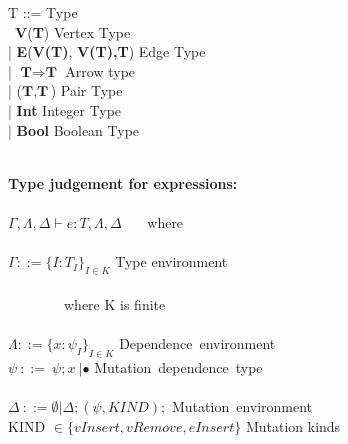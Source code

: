 \begin{frame}
  \begin{tiny}
  \begin{roman-grammar}
  
  
  T ::= \>\>\>\>\> Type \\
    \ttab \ \textbf{V}(\textbf{T}) \>\>\>\>\> Vertex Type \\
    \ttab | \textbf{E}(\textbf{V(T)}, \textbf{V(T),}\textbf{T}) \>\>\>\>\> Edge Type\\
    \ttab | $\textbf{T} \Rightarrow \textbf{T}$ \>\>\>\>\> Arrow type \\
    \ttab | ($\textbf{T}, \textbf{T}$) \>\>\>\>\> Pair Type \\
    \ttab | \textbf{Int} \>\>\>\>\> Integer Type \\
    \ttab | \textbf{Bool} \>\>\>\>\> Boolean Type\\ 
\ \\
\newline
\newline

  \textbf{Type judgement for expressions:}
  \\ \ \\
  $\Gamma, \Lambda, \Delta \vdash e : T, \Lambda, \Delta$ \ \ \  where \\ \ \\
  $\Gamma ::= {\{ I : T_I \}}_{I \in K}$ \>\>\>\> Type environment\\ \ \\
  \ \ \ \ \ \ \ \ where K is finite \\
  \ \\ $\Lambda ::= {\{ x: \psi_I \}}_{I \in K}$  \>\>\>\> Dependence\ environment
  \ \\ $\psi \ ::= \ \psi ;x\ | \bullet $ \>\>\>\> Mutation\ dependence\ type\\
  \ \\ $\Delta \ ::= \emptyset | \Delta; (\psi, KIND);$ \>\>\>\> Mutation\ environment\\
  KIND $\in \{vInsert, vRemove, eInsert\}$ \>\>\>\>  Mutation kinds 

\end{roman-grammar}
\end{tiny}  
\end{frame}